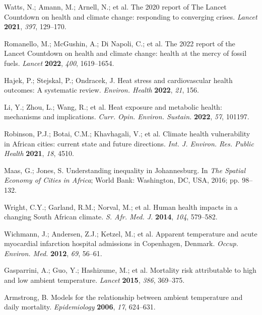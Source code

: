 \documentclass[11pt,a4paper]{article}
\begin{document}
\begin{thebibliography}{99}

Watts, N.; Amann, M.; Arnell, N.; et al. The 2020 report of The Lancet Countdown on health and climate change: responding to converging crises. \textit{Lancet} \textbf{2021}, \textit{397}, 129--170.

Romanello, M.; McGushin, A.; Di Napoli, C.; et al. The 2022 report of the Lancet Countdown on health and climate change: health at the mercy of fossil fuels. \textit{Lancet} \textbf{2022}, \textit{400}, 1619--1654.

Hajek, P.; Stejskal, P.; Ondracek, J. Heat stress and cardiovascular health outcomes: A systematic review. \textit{Environ. Health} \textbf{2022}, \textit{21}, 156.

Li, Y.; Zhou, L.; Wang, R.; et al. Heat exposure and metabolic health: mechanisms and implications. \textit{Curr. Opin. Environ. Sustain.} \textbf{2022}, \textit{57}, 101197.

Robinson, P.J.; Botai, C.M.; Khavhagali, V.; et al. Climate health vulnerability in African cities: current state and future directions. \textit{Int. J. Environ. Res. Public Health} \textbf{2021}, \textit{18}, 4510.

Maas, G.; Jones, S. Understanding inequality in Johannesburg. In \textit{The Spatial Economy of Cities in Africa}; World Bank: Washington, DC, USA, 2016; pp. 98--132.

Wright, C.Y.; Garland, R.M.; Norval, M.; et al. Human health impacts in a changing South African climate. \textit{S. Afr. Med. J.} \textbf{2014}, \textit{104}, 579--582.

Wichmann, J.; Andersen, Z.J.; Ketzel, M.; et al. Apparent temperature and acute myocardial infarction hospital admissions in Copenhagen, Denmark. \textit{Occup. Environ. Med.} \textbf{2012}, \textit{69}, 56--61.

Gasparrini, A.; Guo, Y.; Hashizume, M.; et al. Mortality risk attributable to high and low ambient temperature. \textit{Lancet} \textbf{2015}, \textit{386}, 369--375.

Armstrong, B. Models for the relationship between ambient temperature and daily mortality. \textit{Epidemiology} \textbf{2006}, \textit{17}, 624--631.


\end{thebibliography}
\end{document}
